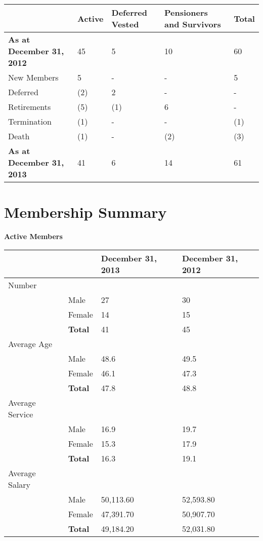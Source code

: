 \documentclass{report}
\begin{document}
\begin{table}[ht]
\bgroup
\def\arraystretch{1.5}
\begin{tabular}{p{4.7cm} p{1.5cm} p{2.5cm} p{4.2cm} p{1.0cm}}
\hline
& Active & Deferred Vested & Pensioners and Survivors & Total \\ \hline
\textbf{As at December 31, 2012} & 45 & 5 & 10 & 60 \\ \hline
New Members & 5 & - & - & 5 \\ \hline
Deferred & (2) & 2 & - & - \\ \hline
Retirements & (5) & (1) & 6 & - \\ \hline
Termination & (1) & - & - & (1) \\ \hline
Death & (1) & - & (2) & (3) \\ \hline
\textbf{As at December 31, 2013} & 41 & 6 & 14 & 61 \\ \hline
\end{tabular}
\egroup
\end{table}

\pagebreak
\section{Membership Summary}

\textbf{Active Members} 

\vspace{3mm}
\bgroup
\normalsize
\def\arraystretch{1.5}
\begin{tabular}{p{4.0cm} p{2.5cm} p{4.0cm} p{4.0cm}}
\hline
& & \textbf{December 31, 2013 } & \textbf{December 31, 2012 } \\ \hline
Number \\
& Male & 27 & 30 \\ 
& Female & 14 & 15 \\ 
& \textbf{Total} & 41 & 45 \\ 
Average Age \\
& Male & 48.6 & 49.5 \\ 
& Female & 46.1 & 47.3 \\
& \textbf{Total} & 47.8 & 48.8 \\
Average Service  \\
& Male & 16.9 & 19.7 \\ 
& Female & 15.3 & 17.9 \\
& \textbf{Total} & 16.3 & 19.1 \\
Average Salary  \\
& Male & 50,113.60 & 52,593.80 \\
& Female & 47,391.70 & 50,907.70 \\
& \textbf{Total} & 49,184.20 & 52,031.80 \\ \hline
\end{tabular}
\egroup
\end{document}
